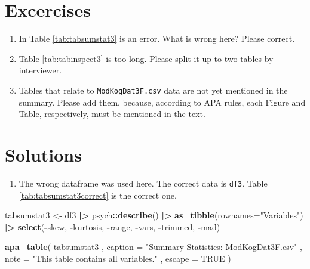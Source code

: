 \documentclass[
  doc,floatsintext]{apa6}
\newenvironment{Shaded}{\begin{snugshade}}{\end{snugshade}}
\newcommand{\AttributeTok}[1]{\textcolor[rgb]{0.13,0.29,0.53}{#1}}
\newcommand{\ConstantTok}[1]{\textcolor[rgb]{0.56,0.35,0.01}{#1}}
\newcommand{\FunctionTok}[1]{\textcolor[rgb]{0.13,0.29,0.53}{\textbf{#1}}}
\newcommand{\NormalTok}[1]{#1}
\newcommand{\OtherTok}[1]{\textcolor[rgb]{0.56,0.35,0.01}{#1}}
\newcommand{\SpecialCharTok}[1]{\textcolor[rgb]{0.81,0.36,0.00}{\textbf{#1}}}
\newcommand{\StringTok}[1]{\textcolor[rgb]{0.31,0.60,0.02}{#1}}
\providecommand{\tightlist}{%
  \setlength{\itemsep}{0pt}\setlength{\parskip}{0pt}}
\begin{document}
\newpage

\hypertarget{excercises}{%
\section{Excercises}\label{excercises}}

\begin{enumerate}
\def\labelenumi{\arabic{enumi}.}
\tightlist
\item
  In Table \ref{tab:tabsumstat3} is an error. What is wrong here? Please correct.
\item
  Table \ref{tab:tabinspect3} is too long. Please split it up to two tables by interviewer.
\item
  Tables that relate to \texttt{ModKogDat3F.csv} data are not yet mentioned in the summary. Please add them, because, according to APA rules, each Figure and Table, respectively, must be mentioned in the text.
\end{enumerate}

\newpage

\hypertarget{solutions}{%
\section{Solutions}\label{solutions}}

\begin{enumerate}
\def\labelenumi{\arabic{enumi}.}
\tightlist
\item
  The wrong dataframe was used here. The correct data is \texttt{df3}. Table \ref{tab:tabsumstat3correct} is the correct one.
\end{enumerate}

\begin{Shaded}
\begin{Highlighting}[]
\NormalTok{tabsumstat3 }\OtherTok{\textless{}{-}}\NormalTok{ df3 }\SpecialCharTok{|\textgreater{}}
\NormalTok{  psych}\SpecialCharTok{::}\FunctionTok{describe}\NormalTok{()   }\SpecialCharTok{|\textgreater{}} 
  \FunctionTok{as\_tibble}\NormalTok{(}\AttributeTok{rownames=}\StringTok{"Variables"}\NormalTok{)  }\SpecialCharTok{|\textgreater{}} 
  \FunctionTok{select}\NormalTok{(}\SpecialCharTok{{-}}\NormalTok{skew, }\SpecialCharTok{{-}}\NormalTok{kurtosis, }\SpecialCharTok{{-}}\NormalTok{range, }\SpecialCharTok{{-}}\NormalTok{vars, }\SpecialCharTok{{-}}\NormalTok{trimmed, }\SpecialCharTok{{-}}\NormalTok{mad) }

\FunctionTok{apa\_table}\NormalTok{(}
\NormalTok{  tabsumstat3}
\NormalTok{  , }\AttributeTok{caption =} \StringTok{"Summary Statistics: \textasciigrave{}ModKogDat3F.csv\textasciigrave{}"}
\NormalTok{  , }\AttributeTok{note =} \StringTok{"This table contains all variables."}
\NormalTok{  , }\AttributeTok{escape =} \ConstantTok{TRUE}
\NormalTok{)}
\end{Highlighting}
\end{Shaded}
\end{document}
